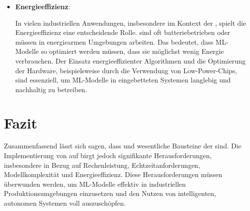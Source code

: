 \begin{itemize}
    \item \textbf{Energieeffizienz}:

    In vielen industriellen Anwendungen, insbesondere im Kontext der \Iviernull, spielt die Energieeffizienz eine entscheidende Rolle. 
    \Emb sind oft batteriebetrieben oder müssen in energiearmen Umgebungen arbeiten. Das bedeutet, dass ML-Modelle so 
    optimiert werden müssen, dass sie möglichst wenig Energie verbrauchen. Der Einsatz energieeffizienter Algorithmen und die Optimierung 
    der Hardware, beispielsweise durch die Verwendung von Low-Power-Chips, sind essenziell, um ML-Modelle in eingebetteten Systemen 
    langlebig und nachhaltig zu betreiben.
\end{itemize}

\section{Fazit}

Zusammenfassend lässt sich sagen, dass \Emb und \ML wesentliche Bausteine der \Iviernull sind. 
Die Implementierung von \ML auf \Emb birgt jedoch signifikante Herausforderungen, insbesondere in Bezug auf 
Rechenleistung, Echtzeitanforderungen, Modellkomplexität und Energieeffizienz. Diese Herausforderungen müssen überwunden werden, 
um ML-Modelle effektiv in industriellen Produktionsumgebungen einzusetzen und den Nutzen von intelligenten, autonomen Systemen 
voll auszuschöpfen.